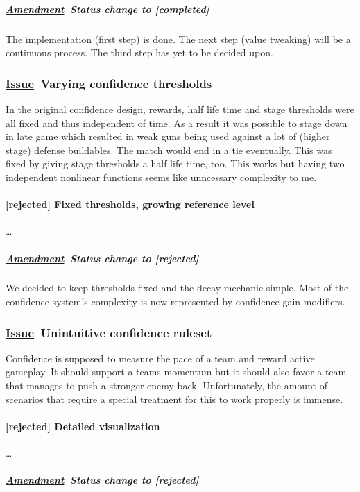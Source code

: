 \documentclass{scrartcl}
\newcommand{\issue}    [0]{\textbf{\underline{Issue}\ }}
\newcommand{\rejected} [0]{\textcolor{rejected} {\textbf{[rejected] }}}
\newcommand{\completed}[0]{\textcolor{completed}{\textbf{[completed] }}}
\newcommand{\amendment}[0]{\textbf{\underline{Amendment}\ }}
\begin{document}
\subparagraph{\amendment Status change to \completed}

The implementation (first step) is done. The next step (value tweaking) will be a continuous process. The third step has yet to be decided upon.

\subsubsection{\issue Varying confidence thresholds}

In the original confidence design, rewards, half life time and stage thresholds were all fixed and thus independent of time. As a result it was possible to stage down in late game which resulted in weak guns being used against a lot of (higher stage) defense buildables. The match would end in a tie eventually. This was fixed by giving stage thresholds a half life time, too. This works but having two independent nonlinear functions seems like unncessary complexity to me.

\paragraph{\rejected Fixed thresholds, growing reference level}

\ldots

\subparagraph{\amendment Status change to \rejected}

We decided to keep thresholds fixed and the decay mechanic simple. Most of the confidence system's complexity is now represented by confidence gain modifiers.

\subsubsection{\issue Unintuitive confidence ruleset}

Confidence is supposed to measure the pace of a team and reward active gameplay. It should support a teams momentum but it should also favor a team that manages to push a stronger enemy back. Unfortunately, the amount of scenarios that require a special treatment for this to work properly is immense.

\paragraph{\rejected Detailed visualization}

\ldots

\subparagraph{\amendment Status change to \rejected}
\end{document}
